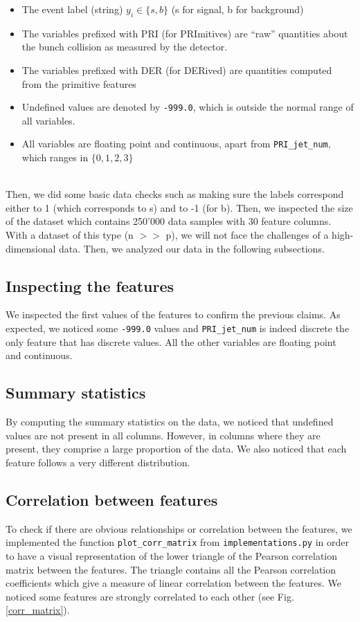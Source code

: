 \documentclass[10pt,conference,compsocconf]{IEEEtran}
\begin{document}
\begin{itemize}

\item The event label (string) $y_i \in \{s, b\}$ (s for signal, b for background)
\item The variables prefixed with PRI (for PRImitives) are “raw” quantities about the bunch collision as measured by the detector.
\item The variables prefixed with DER (for DERived) are quantities computed from the primitive features
\item Undefined values are denoted by \texttt{-999.0}, which is outside the normal range of all variables.
\item All variables are floating point and continuous, apart from 
\texttt{PRI\_jet\_num}, which ranges in $\{0, 1, 2, 3\}$

\end{itemize}
\ \\
Then, we did some basic data checks such as making sure the labels correspond either to 1 (which corresponds to s) and to -1 (for b). Then, we inspected the size of the dataset which contains 250'000 data samples with 30 feature columns. With a dataset of this type (n $>>$ p), we will not face the challenges of a high-dimensional data. Then, we analyzed our data in the following subsections.
\ \\

\subsection{Inspecting the features} 
We inspected the first values of the features to confirm the previous claims. As expected, we noticed some \texttt{-999.0} values and \texttt{PRI\_jet\_num} is indeed discrete the only feature that has discrete values. All the other variables are floating point and continuous.
\subsection{Summary statistics} 
By computing the summary statistics on the data, we noticed that undefined values are not present in all columns. However, in columns where they are present, they comprise a large proportion of the data.
We also noticed that each feature follows a very different distribution. 
\subsection{Correlation between features} 
To check if there are obvious relationships or correlation between the features, we implemented the function \texttt{plot\_corr\_matrix} from \texttt{implementations.py} in order to have a visual representation of the lower triangle of the Pearson correlation matrix between the features. The triangle contains all the Pearson correlation coefficients which give a measure of linear correlation between the features. We noticed some features are strongly correlated to each other (see Fig. \ref{corr_matrix}). 
\end{document}
